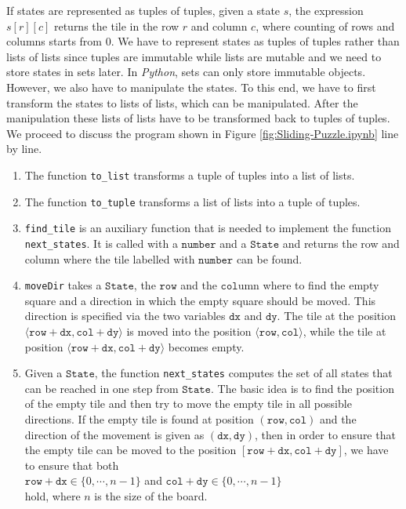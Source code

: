 If states are represented as tuples of tuples, given a state $s$, the expression $s[r][c]$ returns the tile in
the row $r$ and column $c$, where counting of rows and columns starts from $0$.
We have to represent states as tuples of tuples rather than lists of lists since
tuples are immutable while lists are mutable and we need to store states in sets later.  In \textsl{Python},
sets can only store immutable objects.  However, we also have to manipulate the states.  To this end, we have
to first transform the states to lists of lists, which can be manipulated.  After the manipulation these lists of
lists have to be transformed back to tuples of tuples.
We proceed to discuss the program shown in Figure \ref{fig:Sliding-Puzzle.ipynb} line by line.
\begin{enumerate}
\item The function \texttt{to\_list} transforms a tuple of tuples into a list of lists.
\item The function \texttt{to\_tuple} transforms a list of lists into a tuple of tuples.
\item \texttt{find\_tile} is an auxiliary function that is needed to implement the function \texttt{next\_states}.
      It is called with a $\texttt{number}$ and a $\texttt{State}$ and
      returns the row and column where the tile labelled with $\texttt{number}$ can be found.
\item \texttt{moveDir} takes a $\texttt{State}$, the $\texttt{row}$ and the $\texttt{col}$umn
      where to find the empty square and a direction in which the empty square should be moved.
      This direction is specified via the two variables $\texttt{dx}$ and $\texttt{dy}$.  The tile
      at the position $\langle\mathtt{row} + \mathtt{dx}, \mathtt{col} + \mathtt{dy}\rangle$ is
      moved into the position $\langle\mathtt{row}, \mathtt{col}\rangle$, while the tile at position
      $\langle\mathtt{row} + \mathtt{dx}, \mathtt{col} + \mathtt{dy}\rangle$ becomes empty.
\item Given a $\texttt{State}$, the function \texttt{next\_states} computes the set of all states
      that can be reached in one step from $\texttt{State}$.  The basic idea is to find the position of the
      empty tile and then try to move the empty tile in all possible directions.  If the empty tile is found at
      position $(\mathtt{row}, \mathtt{col})$ and the direction of the movement is given as $(\mathtt{dx}, \mathtt{dy})$, then
      in order to ensure that the empty tile can be moved to the position $[\mathtt{row}+\mathtt{dx}, \mathtt{col}+\mathtt{dy}]$,
      we have to ensure that both
      \\[0.2cm]
      \hspace*{1.3cm}
      $\mathtt{row}+\mathtt{dx} \in \{0,\cdots,n-1\}$ \quad and \quad
      $\mathtt{col}+\mathtt{dy} \in \{0,\cdots,n-1\}$
      \\[0.2cm]
      hold, where $n$ is the size of the board.
\end{enumerate}

